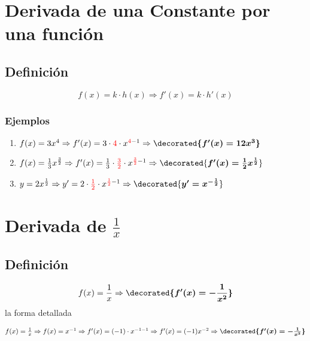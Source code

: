 \documentclass{article}
\newcommand{\tmcolor}[2]{{\color{#1}{#2}}}
\newcommand{\tmmathbf}[1]{\ensuremath{\boldsymbol{#1}}}
\begin{document}
\section{Derivada de una Constante por una funci{\'o}n}

\subsection{Definici{\'o}n}

\[ f (x) = k \cdot h (x) \Rightarrow f' (x) = k \cdot h' (x) \]

\subsubsection{Ejemplos}

\begin{enumerate}
  \item $f (x) = 3 x^4 \Rightarrow f' (x) = 3 \cdot \tmcolor{red}{4} \cdot
  x^{\tmcolor{red}{4} - 1} \Rightarrow \tmmathbf{\decorated{f' (x) = 12 x^3}}$
  
  \item $f (x) = \frac{1}{3} x^{\frac{3}{2}} \Rightarrow f' (x) = \frac{1}{3}
  \cdot \tmcolor{red}{\frac{3}{2}} \cdot x^{\tmcolor{red}{\frac{3}{2}} - 1}
  \Rightarrow \decorated{\tmmathbf{f' (x) = \frac{1}{2} x^{\frac{1}{2}}}}$
  
  \item $y = 2 x^{\frac{1}{2}} \Rightarrow y' = 2 \cdot
  \tmcolor{red}{\frac{1}{2}} \cdot x^{\tmcolor{red}{\frac{1}{2}} - 1}
  \Rightarrow \decorated{\tmmathbf{y' = x^{- \frac{1}{2}}}}$
\end{enumerate}
{\newpage}

\section{Derivada de $\frac{1}{x}$}

\subsection{Definici{\'o}n}

\[ f (x) = \frac{1}{x} \Rightarrow \tmmathbf{\decorated{f' (x) = -
   \frac{1}{x^2}}} \]
la forma detallada

$f (x) = \frac{1}{x} \Rightarrow f (x) = x^{- 1} \Rightarrow f' (x) = (- 1)
\cdot x^{- 1 - 1} \Rightarrow f' (x) = (- 1) x^{- 2} \Rightarrow
\tmmathbf{\decorated{f' (x) = - \frac{1}{x^2}}}$
\end{document}

